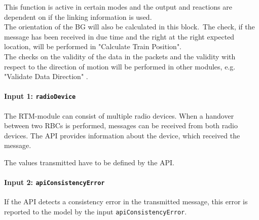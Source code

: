\documentclass{template/openetcs_report}
\begin{document}
This function is active in certain modes and the output and reactions are dependent on if the linking information is used.\\
The orientation of the BG will also be calculated in this block.\
The check, if the message has been received in due time and the right at the right expected location, will be performed in "Calculate Train Position".\\
The checks on the validity of the data in the packets and the validity with respect to the direction of motion will be performed in other modules, e.g. "Validate Data Direction" .


\paragraph{Input 1: \texttt{radioDevice}}
The RTM-module can consist of multiple radio devices. When a handover between two RBCs is performed, messages can be received from both radio devices. The API provides information about the device, which received the message.

The values transmitted have to be defined by the API.

\paragraph{Input 2: \texttt{apiConsistencyError}}
If the API detects a consistency error in the transmitted message, this error is reported to the model by the input \texttt{apiConsistencyError}.
\end{document}
